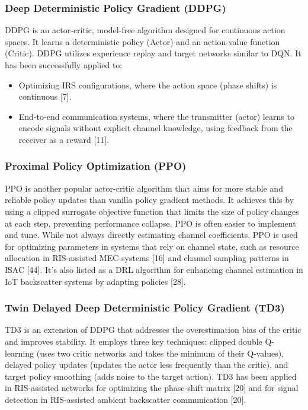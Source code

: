 \documentclass[journal,twocolumn]{IEEEtran}
\begin{document}
\subsubsection{Deep Deterministic Policy Gradient (DDPG)}
DDPG is an actor-critic, model-free algorithm designed for continuous action spaces. It learns a deterministic policy (Actor) and an action-value function (Critic). DDPG utilizes experience replay and target networks similar to DQN. It has been successfully applied to:
\begin{itemize}
    \item Optimizing IRS configurations, where the action space (phase shifts) is continuous [7].
    \item End-to-end communication systems, where the transmitter (actor) learns to encode signals without explicit channel knowledge, using feedback from the receiver as a reward [11].
\end{itemize}

\subsubsection{Proximal Policy Optimization (PPO)}
PPO is another popular actor-critic algorithm that aims for more stable and reliable policy updates than vanilla policy gradient methods. It achieves this by using a clipped surrogate objective function that limits the size of policy changes at each step, preventing performance collapse. PPO is often easier to implement and tune.
While not always directly estimating channel coefficients, PPO is used for optimizing parameters in systems that rely on channel state, such as resource allocation in RIS-assisted MEC systems [16] and channel sampling patterns in ISAC [44]. It's also listed as a DRL algorithm for enhancing channel estimation in IoT backscatter systems by adapting policies [28].

\subsubsection{Twin Delayed Deep Deterministic Policy Gradient (TD3)}
TD3 is an extension of DDPG that addresses the overestimation bias of the critic and improves stability. It employs three key techniques: clipped double Q-learning (uses two critic networks and takes the minimum of their Q-values), delayed policy updates (updates the actor less frequently than the critic), and target policy smoothing (adds noise to the target action).
TD3 has been applied in RIS-assisted networks for optimizing the phase-shift matrix [20] and for signal detection in RIS-assisted ambient backscatter communication [20].
\end{document}
